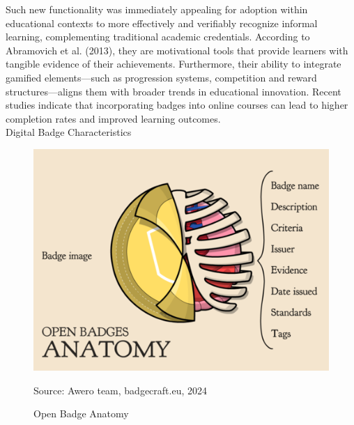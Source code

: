 Such new functionality was immediately appealing for adoption within educational contexts to more effectively and verifiably recognize informal learning, complementing traditional academic credentials. 
According to Abramovich et al. (2013)\cite{areBadgesUseful}, they are motivational tools that provide learners with tangible evidence of their achievements. 
Furthermore, their ability to integrate gamified elements—such as progression systems, competition and reward structures—aligns them with broader trends in educational innovation. 
Recent studies indicate that incorporating badges into online courses can lead to higher completion rates and improved learning outcomes\cite{higherRates}.\\
{Digital Badge Characteristics}
%
\begin{figure}[htbp]
 \centering
 \includegraphics[width=14cm]{Media/OpenBadgeAnatomy.png}
 \caption{Open Badge Anatomy}
 \label{fig:badgeAnatomy}
 {\raggedright \small{Source: Awero team, badgecraft.eu, 2024}\par}
\end{figure}
%
